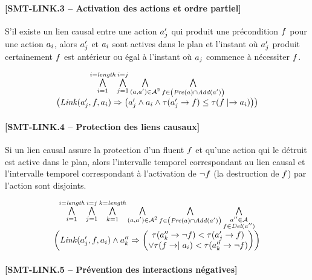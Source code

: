 \paragraph*{[SMT-LINK.3 -- Activation des actions et ordre partiel]}

S’il existe un lien causal entre une action $a'_{j}$ qui produit une précondition $f$ pour une action $a_{i}$, alors $a'_{j}$ et $a_{i}$ sont actives dans le plan et l’instant où $a'_{j}$ produit certainement $f$ est antérieur ou égal à l’instant où $a_{j}$ commence à nécessiter $f$.

\[
\begin{matrix}
\bigwedge\limits_{\substack{i=1}}^{i=\textit{length}} \bigwedge\limits_{\substack{j=1}}^{i=j} \bigwedge\limits_{\substack{(a,a')\in\mathcal{A}^{2}}} \bigwedge\limits_{\substack{f\in\left(\mathit{Pre}(a)\cap\mathit{Add}(a')\right)}}\\ \left( \mathit{Link}(a'_{j},f,a_{i}) \Rightarrow \left( a'_{j} \wedge a_{i} \wedge \tau(a'_{j}\rightarrow f) \leq \tau(f\mid\rightarrow a_{i}) \right) \right)
\end{matrix}
\]

\paragraph*{[SMT-LINK.4 -- Protection des liens causaux]}

Si un lien causal assure la protection d’un fluent $f$ et qu'une action qui le détruit est active dans le plan, alors l’intervalle temporel correspondant au lien causal et l’intervalle temporel correspondant à l’activation de $\neg f$ (la destruction de $f$) par l’action sont disjoints.

\[
\begin{matrix}
\bigwedge\limits_{\substack{i=1}}^{i=\textit{length}} \bigwedge\limits_{\substack{j=1}}^{i=j} \bigwedge\limits_{\substack{k=1}}^{k=\textit{length}} \bigwedge\limits_{\substack{(a,a')\in\mathcal{A}^{2}}} \bigwedge\limits_{\substack{f\in\left(\mathit{Pre}(a)\cap\mathit{Add}(a')\right)}} \bigwedge\limits_{\substack{a''\in\mathcal{A}\\f\in\mathit{Del}(a'')}}\\ \left( \mathit{Link}(a'_{j},f,a_{i}) \wedge a''_{k} \Rightarrow \left( \begin{matrix} \tau(a''_{k}\rightarrow\neg f) < \tau(a'_{j}\rightarrow f)\\ \vee \tau(f\rightarrow\mid a_{i}) < \tau(a''_{k}\rightarrow\neg f) \end{matrix} \right) \right)
\end{matrix}
\]

\paragraph*{[SMT-LINK.5 -- Prévention des interactions négatives]}

